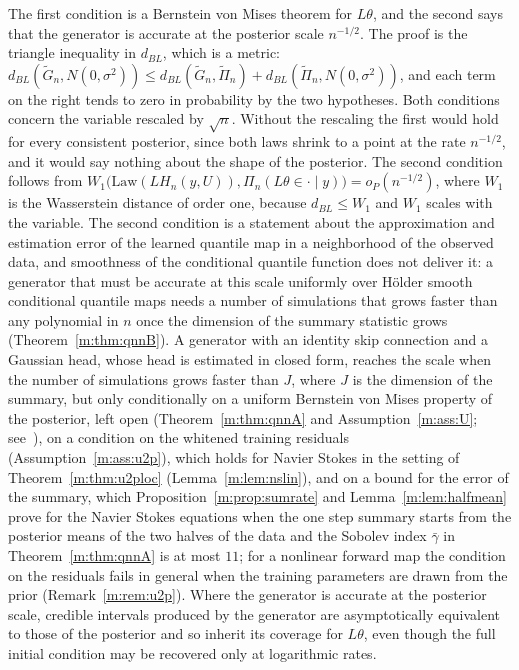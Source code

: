 The first condition is a Bernstein von Mises theorem for $L\theta$, and the second says that the generator is accurate at the posterior scale $n^{-1/2}$. The proof is the triangle inequality in $d_{BL}$, which is a metric: $d_{BL}(\tilde G_n,N(0,\sigma^2))\leq d_{BL}(\tilde G_n,\tilde\Pi_n)+d_{BL}(\tilde\Pi_n,N(0,\sigma^2))$, and each term on the right tends to zero in probability by the two hypotheses. Both conditions concern the variable rescaled by $\sqrt n$. Without the rescaling the first would hold for every consistent posterior, since both laws shrink to a point at the rate $n^{-1/2}$, and it would say nothing about the shape of the posterior. The second condition follows from $W_1\big(\mathrm{Law}(LH_n(y,U)),\Pi_n(L\theta\in\cdot\mid y)\big) = o_P(n^{-1/2})$, where $W_1$ is the Wasserstein distance of order one, because $d_{BL}\leq W_1$ and $W_1$ scales with the variable. The second condition is a statement about the approximation and estimation error of the learned quantile map in a neighborhood of the observed data, and smoothness of the conditional quantile function does not deliver it: a generator that must be accurate at this scale uniformly over H\"older smooth conditional quantile maps needs a number of simulations that grows faster than any polynomial in $n$ once the dimension of the summary statistic grows (Theorem~\ref{m:thm:qnnB}). A generator with an identity skip connection and a Gaussian head, whose head is estimated in closed form, reaches the scale when the number of simulations grows faster than $J$, where $J$ is the dimension of the summary, but only conditionally on a uniform Bernstein von Mises property of the posterior, left open (Theorem~\ref{m:thm:qnnA} and Assumption~\ref{m:ass:U}; see~\cite{polsonsokolov2026manifold}), on a condition on the whitened training residuals (Assumption~\ref{m:ass:u2p}), which holds for Navier Stokes in the setting of Theorem~\ref{m:thm:u2ploc} (Lemma~\ref{m:lem:nslin}), and on a bound for the error of the summary, which Proposition~\ref{m:prop:sumrate} and Lemma~\ref{m:lem:halfmean} prove for the Navier Stokes equations when the one step summary starts from the posterior means of the two halves of the data and the Sobolev index $\bar\gamma$ in Theorem~\ref{m:thm:qnnA} is at most $11$; for a nonlinear forward map the condition on the residuals fails in general when the training parameters are drawn from the prior (Remark~\ref{m:rem:u2p}). Where the generator is accurate at the posterior scale, credible intervals produced by the generator are asymptotically equivalent to those of the posterior and so inherit its coverage for $L\theta$, even though the full initial condition may be recovered only at logarithmic rates.

